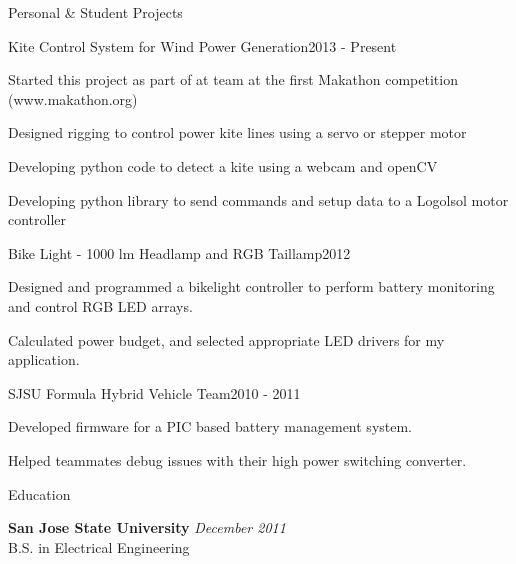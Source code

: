 \documentclass{resume} %
\begin{document}
\pagebreak[3]
\begin{rSection}{Personal \& Student Projects}

\vspace{-0.5em}
\begin{rProject}{Kite Control System for Wind Power Generation}{2013 - Present}
\item Started this project as part of at team at the first Makathon competition (www.makathon.org)
\item Designed rigging to control power kite lines using a servo or stepper motor
\item Developing python code to detect a kite using a webcam and openCV
\item Developing python library to send commands and setup data to a Logolsol motor controller
\end{rProject}

\vspace{-0.5em}
\begin{rProject}{Bike Light - 1000 lm Headlamp and RGB Taillamp}{2012}
\item Designed and programmed a bikelight controller to perform battery monitoring and control RGB LED arrays.
\item Calculated power budget, and selected appropriate LED drivers for my application.
\end{rProject}
\vspace{-0.5em}

\begin{rProject}{SJSU Formula Hybrid Vehicle Team}{2010 - 2011}
\item Developed firmware for a PIC based battery management system.
\item Helped teammates debug issues with their high power switching converter.
\end{rProject}
\end{rSection}

\pagebreak[3]
\begin{rSection}{Education}

{\bf San Jose State University} \hfill {\em December 2011} \\ 
B.S. in Electrical Engineering \\

\end{rSection}
\end{document}
